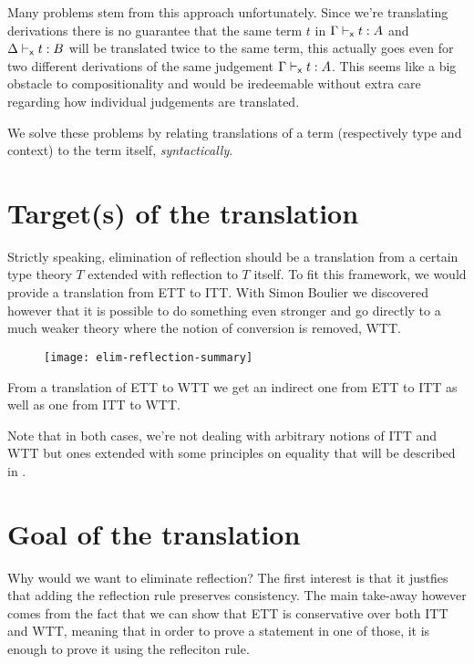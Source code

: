Many problems stem from this approach unfortunately. Since we're translating
derivations there is no guarantee that the same term \(t\) in
\(\Gamma \vdash_{\mathsf{x}} t : A\) and \(\Delta \vdash_{\mathsf{x}} t : B\) will be translated
twice to the same term, this actually goes even for two different derivations
of the same judgement \(\Gamma \vdash_{\mathsf{x}} t : A\).
This seems like a big obstacle to compositionality and would be iredeemable
without extra care regarding how individual judgements are translated.

We solve these problems by relating translations of a term (respectively
type and context) to the term itself, \emph{syntactically}.

\section{Target(s) of the translation}

Strictly speaking, elimination of reflection should be a translation from a
certain type theory \(T\) extended with reflection to \(T\) itself.
To fit this framework, we would provide a translation from \acrshort{ETT}
to \acrshort{ITT}. With Simon Boulier we discovered however that it is possible
to do something even stronger and go directly to a much weaker theory where
the notion of conversion is removed, \acrshort{WTT}.

\begin{figure}[hb]
  \texttt{[image: elim-reflection-summary]}
\end{figure}

From a translation of \acrshort{ETT} to \acrshort{WTT} we get an indirect one
from \acrshort{ETT} to \acrshort{ITT} as well as one from \acrshort{ITT} to
\acrshort{WTT}.

Note that in both cases, we're not dealing with arbitrary notions of
\acrshort{ITT} and \acrshort{WTT} but ones extended with some principles on
equality that will be described in .

\section{Goal of the translation}

Why would we want to eliminate reflection? The first interest is that it
justfies that adding the reflection rule preserves consistency.
The main take-away however comes from the fact that we can show that
\acrshort{ETT} is conservative over both \acrshort{ITT} and \acrshort{WTT},
meaning that in order to prove a statement in one of those, it is enough
to prove it using the refleciton rule.
%
%

